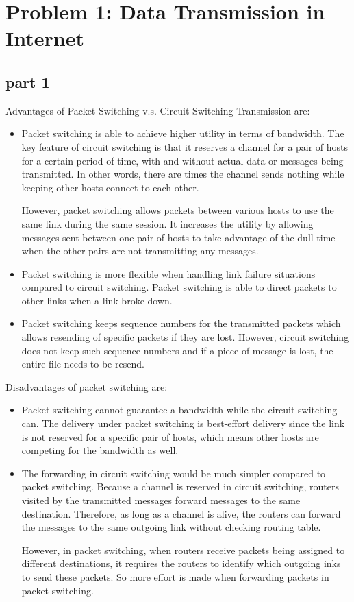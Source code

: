 \section{Problem 1: Data Transmission in Internet}

\subsection{part 1}
Advantages of Packet Switching v.s. Circuit Switching Transmission are:

\begin{itemize}
\item Packet switching is able to achieve higher utility in terms of bandwidth. The key feature of circuit switching is that it reserves a channel for a pair of hosts for a certain period of time, with and without actual data or messages being transmitted. In other words, there are times the channel sends nothing while keeping other hosts connect to each other.

However, packet switching allows packets between various hosts to use the same link during the same session. It increases the utility by allowing messages sent between one pair of hosts to take advantage of the dull time when the other pairs are not transmitting any messages.

\item Packet switching is more flexible when handling link failure situations compared to circuit switching. Packet switching is able to direct packets to other links when a link broke down.

\item Packet switching keeps sequence numbers for the transmitted packets which allows resending of specific packets if they are lost. However, circuit switching does not keep such sequence numbers and if a piece of message is lost, the entire file needs to be resend.
\end{itemize}

Disadvantages of packet switching are:

\begin{itemize}
\item Packet switching cannot guarantee a bandwidth while the circuit switching can. The delivery under packet switching is best-effort delivery since the link is not reserved for a specific pair of hosts, which means other hosts are competing for the bandwidth as well.

\item The forwarding in circuit switching would be much simpler compared to packet switching. Because a channel is reserved in circuit switching, routers visited by the transmitted messages forward messages to the same destination. Therefore, as long as a channel is alive, the routers can forward the messages to the same outgoing link without checking routing table.

However, in packet switching, when routers receive packets being assigned to different destinations, it requires the routers to identify which outgoing inks to send these packets. So more effort is made when forwarding packets in packet switching.
\end{itemize}

